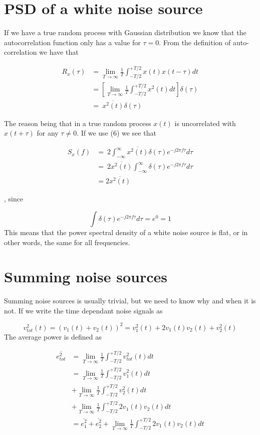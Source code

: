 \section{PSD of a white noise source}\label{psd-of-a-white-noise-source}

If we have a true random process with Gaussian distribution we know that
the autocorrelation function only has a value for \(\tau=0\). From the
definition of auto-correlation we have that

\[\begin{aligned}
R_x(\tau ) &={}  \lim_{T\to\infty} \frac{1}{T}\int^{+T/2}_{-T/2}{ x(t)x(t - \tau) dt} \\
&={} \left[ \lim_{T\to\infty} \frac{1}{T}\int^{+T/2}_{-T/2}{ x^2(t) dt} \right] \delta(\tau) \\
&={}\: \overline{x^2(t)}\delta(\tau)
\end{aligned}\]

The reason being that in a true random process \(x(t)\) is uncorrelated
with \(x(t + \tau )\) for any \(\tau \neq 0\). If we use (6) we see that

\[\begin{aligned}
  S_x(f) &=\: 2\int_{-\infty}^{\infty}{\overline{x^2(t)}\delta(\tau)e^{-j 2 \pi f \tau} d\tau} \\
&=\:2\overline{x^2(t)} \int_{-\infty}^{\infty}{\delta(\tau)e^{-j 2 \pi f \tau}
    d\tau} \\
&= 2\overline{x^2(t)}
\end{aligned}\]

, since

\[\int{\delta(\tau)e^{-j 2 \pi f \tau} d\tau} = e^0 = 1\] This means
that the power spectral density of a white noise source is flat, or in
other words, the same for all frequencies.

\section{Summing noise sources}\label{summing-noise-sources}

Summing noise sources is usually trivial, but we need to know why and
when it is not. If we write the time dependant noise signals as

\[v_{tot}^2(t) = (v_1(t) + v_2(t))^2 = v_1^2(t) + 2v_1(t)v_2(t) + v_2^2(t)\]
The average power is defined as

\[\begin{aligned}
  \overline{e_{tot}^2} &= \lim_{T\to\infty} \frac{1}{T}\int^{+T/2}_{-T/2}{ v_{tot}^2(t) dt} \\
&= \lim_{T\to\infty} \frac{1}{T}\int^{+T/2}_{-T/2}{ v_1^2(t) dt} \\
&+  \lim_{T\to\infty} \frac{1}{T}\int^{+T/2}_{-T/2}{ v_2^2(t) dt} \\
&+ \lim_{T\to\infty} \frac{1}{T}\int^{+T/2}_{-T/2}{ 2v_1(t)v_2(t) dt} \\
&= \overline{e_{1}^2} + \overline{e_{2}^2}
+ \lim_{T\to\infty} \frac{1}{T}\int^{+T/2}_{-T/2}{ 2v_1(t)v_2(t) dt}
\end{aligned}\]

